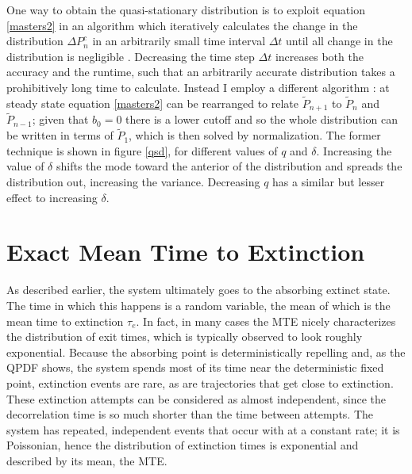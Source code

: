 One way to obtain the quasi-stationary distribution is to exploit equation \ref{masters2} in an algorithm which iteratively calculates the change in the distribution $\Delta P^c_n$ in an arbitrarily small time interval $\Delta t$ until all change in the distribution is negligible \cite{Badali2018}. 
Decreasing the time step $\Delta t$ increases both the accuracy and the runtime, such that an arbitrarily accurate distribution takes a prohibitively long time to calculate. 
Instead I employ a different algorithm \cite{Nisbet1982}: at steady state equation \ref{masters2} can be rearranged to relate $\tilde{P}_{n+1}$ to $\tilde{P}_n$ and $\tilde{P}_{n-1}$; given that $b_0=0$ there is a lower cutoff and so the whole distribution can be written in terms of $\tilde{P}_1$, which is then solved by normalization. 
The former technique is shown in figure \ref{qsd}, for different values of $q$ and $\delta$. %
Increasing the value of $\delta$ shifts the mode toward the anterior of the distribution and spreads the distribution out, increasing the variance. 
Decreasing $q$ has a similar but lesser effect to increasing $\delta$. %


\section{Exact Mean Time to Extinction}%

As described earlier, the system ultimately goes to the absorbing extinct state.
The time in which this happens is a random variable, the mean of which is the mean time to extinction $\tau_e$. %
In fact, in many cases the MTE nicely characterizes the distribution of exit times, which is typically observed to look roughly exponential. 
Because the absorbing point is deterministically repelling and, as the QPDF shows, the system spends most of its time near the deterministic fixed point, extinction events are rare, as are trajectories that get close to extinction. 
These extinction attempts can be considered as almost independent, since the decorrelation time is so much shorter than the time between attempts. 
The system has repeated, independent events that occur with at a constant rate; it is Poissonian, hence the distribution of extinction times is exponential and described by its mean, the MTE. 

